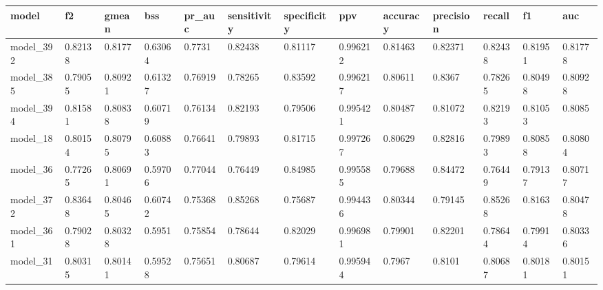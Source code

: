 \begin{tabular}{|l|l|l|l|l|l|l|l|l|l|l|l|l|}
\hline
\textbf{model} & \textbf{f2} & \textbf{gmean} & \textbf{bss} & \textbf{pr\_auc} & \textbf{sensitivity} & \textbf{specificity} & \textbf{ppv} & \textbf{accuracy} & \textbf{precision} & \textbf{recall} & \textbf{f1} & \textbf{auc} \\ \hline
model\_392     & 0.82138     & 0.8177         & 0.63064      & 0.7731           & 0.82438              & 0.81117              & 0.996212     & 0.81463           & 0.82371            & 0.82438         & 0.81951     & 0.81778      \\ \hline
model\_385     & 0.79055     & 0.80921        & 0.61327      & 0.76919          & 0.78265              & 0.83592              & 0.996217     & 0.80611           & 0.8367             & 0.78265         & 0.80498     & 0.80928      \\ \hline
model\_394     & 0.81581     & 0.80838        & 0.60719      & 0.76134          & 0.82193              & 0.79506              & 0.995421     & 0.80487           & 0.81072            & 0.82193         & 0.81053     & 0.8085       \\ \hline
model\_18      & 0.80154     & 0.80795        & 0.60883      & 0.76641          & 0.79893              & 0.81715              & 0.997267     & 0.80629           & 0.82816            & 0.79893         & 0.80858     & 0.80804      \\ \hline
model\_36      & 0.77265     & 0.80691        & 0.59706      & 0.77044          & 0.76449              & 0.84985              & 0.995585     & 0.79688           & 0.84472            & 0.76449         & 0.79137     & 0.80717      \\ \hline
model\_372     & 0.83648     & 0.80465        & 0.60742      & 0.75368          & 0.85268              & 0.75687              & 0.994436     & 0.80344           & 0.79145            & 0.85268         & 0.8163      & 0.80478      \\ \hline
model\_361     & 0.79028     & 0.80328        & 0.5951       & 0.75854          & 0.78644              & 0.82029              & 0.996981     & 0.79901           & 0.82201            & 0.78644         & 0.79914     & 0.80336      \\ \hline
model\_31      & 0.80315     & 0.80141        & 0.59528      & 0.75651          & 0.80687              & 0.79614              & 0.995944     & 0.7967            & 0.8101             & 0.80687         & 0.80181     & 0.80151      \\ \hline

\end{tabular}
